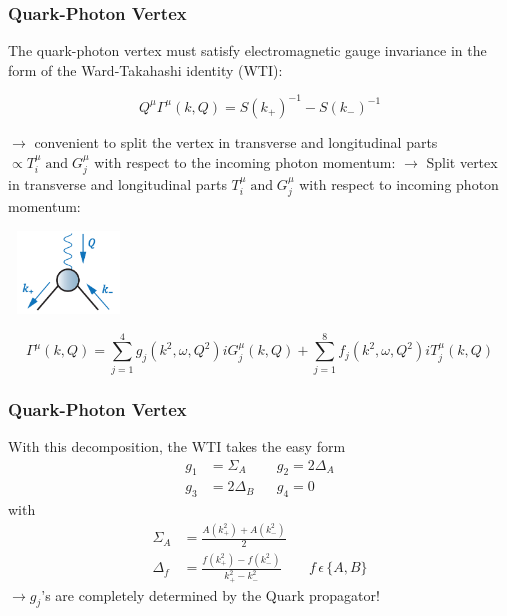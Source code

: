 \begin{frame}\frametitle{Quark-Photon Vertex}
The quark-photon vertex must satisfy electromagnetic gauge invariance in the form of the
Ward-Takahashi identity (WTI):

\begin{equation}
	Q^\mu\Gamma^\mu(k, Q)=S(k_+)^{-1}-S(k_-)^{-1}
\end{equation}

\begin{minipage}[r]{0.65\textwidth}

	$\rightarrow$ convenient to split the vertex in transverse and longitudinal parts $\propto T_i^{\mu} \; \text{and} \;  G_j^{\mu} $ with respect to the incoming photon momentum:
	$\rightarrow$ Split vertex in transverse and longitudinal parts $T_i^{\mu} \; \text{and} \; G_j^{\mu} $ with respect to incoming photon momentum:
\end{minipage}
\begin{minipage}[r]{0.30\textwidth}
	\hspace{2mm}
	\includegraphics[height=2.2cm, width=3.2cm]{Vertex.png}
\end{minipage}

\begin{equation}
	\Gamma^\mu(k,Q)=\sum_{j=1}^4 g_j(k^2, \omega, Q^2)iG^\mu_j(k, Q)+\sum_{j=1}^8 f_j(k^2, \omega, Q^2)iT^\mu_j(k, Q)
\end{equation}

\end{frame}



\begin{frame}\frametitle{Quark-Photon Vertex}

With this decomposition, the WTI takes the easy form 
%
\begin{align}
g_1 &= \Sigma_A && g_2=2\Delta_A \\\nonumber
g_3&= 2\Delta_B && g_4=0
\end{align}
%
with 
%
\begin{align}
\Sigma_A&=\frac{A(k_+^2) + A(k_-^2)}{2} \\\nonumber
\Delta_f&=\frac{f(k_+^{2}) - f(k_-^2)}{k_+^2 - k_{-}^2} && f\, \epsilon \, \lbrace A,B \rbrace 
\end{align}
%
$\rightarrow g_j$'s are completely determined by the Quark propagator!

\end{frame}


\endinput
